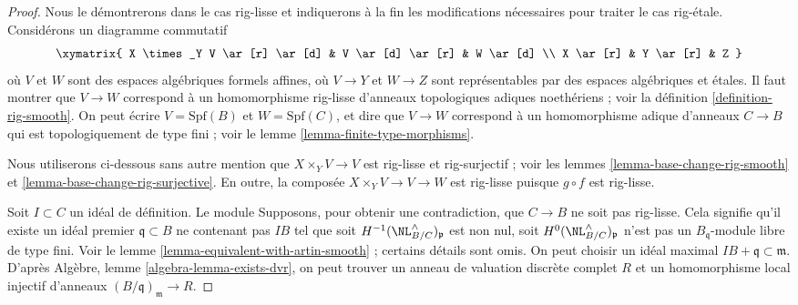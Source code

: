 \begin{proof}
Nous le démontrerons dans le cas rig-lisse et indiquerons à la fin
les modifications nécessaires pour traiter le cas rig-étale.
Considérons un diagramme commutatif
$$
\xymatrix{
X \times_Y V \ar[r] \ar[d] &
V \ar[d] \ar[r] &
W \ar[d] \\
X \ar[r] &
Y \ar[r] &
Z
}
$$
où $V$ et $W$ sont des espaces algébriques formels affines, où $V \to Y$ et $W \to Z$
sont représentables par des espaces algébriques et étales. Il faut montrer que
$V \to W$ correspond à un homomorphisme rig-lisse d'anneaux topologiques
adiques noethériens ; voir la définition \ref{definition-rig-smooth}.
On peut écrire $V = \text{Spf}(B)$ et $W = \text{Spf}(C)$, et dire que
$V \to W$ correspond à un homomorphisme adique d'anneaux $C \to B$ qui est
topologiquement de type fini ; voir le lemme \ref{lemma-finite-type-morphisms}.

\medskip\noindent
Nous utiliserons ci-dessous sans autre mention que $X \times_Y V \to V$
est rig-lisse et rig-surjectif ; voir les
lemmes \ref{lemma-base-change-rig-smooth} et
\ref{lemma-base-change-rig-surjective}.
En outre, la composée $X \times_Y V \to V \to W$ est rig-lisse
puisque $g \circ f$ est rig-lisse.

\medskip\noindent
Soit $I \subset C$ un idéal de définition. Le module
Supposons, pour obtenir une contradiction, que $C \to B$ ne soit pas rig-lisse.
Cela signifie qu'il existe un idéal premier $\mathfrak q \subset B$
ne contenant pas $IB$ tel que soit $H^{-1}(\NL_{B/C}^\wedge)_\mathfrak p$
est non nul, soit $H^0(\NL_{B/C}^\wedge)_\mathfrak p$ n'est pas un
$B_\mathfrak q$-module libre de type fini. Voir le
lemme \ref{lemma-equivalent-with-artin-smooth} ; certains détails sont
omis. On peut choisir un idéal maximal
$IB + \mathfrak q \subset \mathfrak m$. D'après
Algèbre, lemme \ref{algebra-lemma-exists-dvr},
on peut trouver un anneau de valuation discrète complet $R$ et un
homomorphisme local injectif d'anneaux $(B/\mathfrak q)_\mathfrak m \to R$.


\end{proof}
